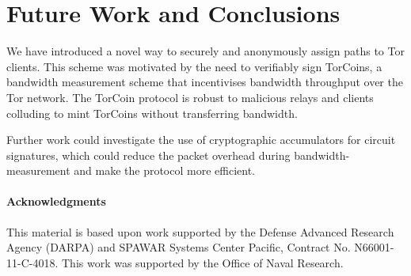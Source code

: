 \section{Future Work and Conclusions} \label{conc}

We have introduced a novel way to securely and anonymously assign paths to Tor
clients. This scheme was motivated by the need to verifiably sign TorCoins, a
bandwidth measurement scheme that incentivises bandwidth throughput over the Tor
network. The TorCoin protocol is robust to malicious relays and clients
colluding to mint TorCoins without transferring bandwidth.

Further work could investigate the use of cryptographic accumulators for circuit
signatures, which could reduce the packet overhead during bandwidth-measurement
and make the protocol more efficient.

\paragraph{Acknowledgments}

This material is based upon work supported by the Defense Advanced Research
Agency (DARPA) and SPAWAR Systems Center Pacific, Contract No. N66001-11-C-4018.
This work was supported by the Office of Naval Research.

